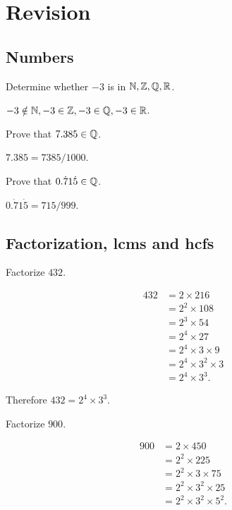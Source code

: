\documentclass[8pt]{article}
\author{\Author}
\title{\Title}
\date{\Date}
\begin{document}
	\maketitle

	\tableofcontents

	\section{Revision}

		\subsection{Numbers}

			\prob Determine whether \(-3\) is in \(\mathbb{N}, \mathbb{Z}, \mathbb{Q}, \mathbb{R}\).
			
			\solution \(-3 \notin \mathbb{N}, -3 \in \mathbb{Z}, -3 \in \mathbb{Q}, -3 \in \mathbb{R}\).\newline

			\prob Prove that \(7.385 \in \mathbb{Q}\).

			\solution \(7.385 = 7385/1000\).\newline

			\prob Prove that \(0.\dot{7}1\dot{5} \in \mathbb{Q}\).
			
			\solution \(0.\dot{7}1\dot{5} = 715/999\).

		\subsection{Factorization, lcms and hcfs}

			\prob Factorize \(432\).
			
			\solution
			
			\begin{align*}
				432 &= 2 \times 216\\
				    &= 2^2 \times 108\\
					&= 2^3 \times 54\\
					&= 2^4 \times 27\\
					&= 2^4 \times 3 \times 9\\
					&= 2^4 \times 3^2 \times 3\\
					&= 2^4 \times 3^3.
			\end{align*}

			Therefore \(432 = 2^4 \times 3^3\). \newline

			\prob Factorize \(900\).
			
			\solution
			
			\begin{align*}
				900 &= 2 \times 450\\
				    &= 2^2 \times 225\\
					&= 2^2 \times 3 \times 75\\
					&= 2^2 \times 3^2 \times 25\\
					&= 2^2 \times 3^2 \times 5^2.
			\end{align*}
\end{document}
